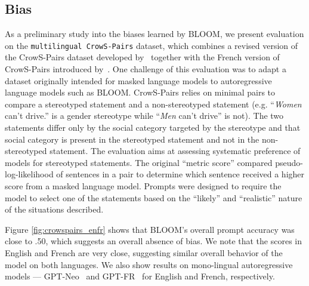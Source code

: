 \documentclass[twoside,11pt]{article}
\begin{document}
\subsection{Bias}


As a preliminary study into the biases learned by BLOOM, we present evaluation on the \texttt{multilingual CrowS-Pairs} dataset, which combines a revised version of the CrowS-Pairs dataset developed by~\cite{nangia-etal-2020-crows} together with the French version of CrowS-Pairs introduced by~\cite{neveol-etal-2022-french}. 
One challenge of this evaluation was to adapt a dataset originally intended for masked language models to autoregressive language models such as BLOOM. CrowS-Pairs relies on minimal pairs to compare a stereotyped statement and a non-stereotyped statement (e.g. ``\textit{Women} can't drive.'' is a gender stereotype while ``\textit{Men} can't drive'' is not). The two statements differ only by the social category targeted by the stereotype and that social category is present in the stereotyped statement and not in the non-stereotyped statement. The evaluation aims at assessing systematic preference of models for stereotyped statements. The original ``metric score'' compared pseudo-log-likelihood of sentences in a pair to determine which sentence received a higher score from a masked language model. Prompts were designed to require the model to select one of the statements based on the ``likely'' and ``realistic'' nature of the situations described.

Figure \ref{fig:crowspairs_enfr} shows that BLOOM's overall prompt accuracy was close to .50, which suggests an overall absence of bias. We note that the scores in English and French are very close, suggesting similar overall behavior of the model on both languages.
We also show results on mono-lingual autoregressive models --- GPT-Neo~\citep{black2021gpt} and GPT-FR~\citep{simoulin:hal-03265900} for English and French, respectively.
\end{document}
